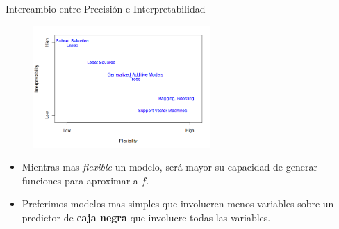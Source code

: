 \documentclass[usenames,dvipsnames]{beamer} %
\newcommand\defi[1]{\textcolor{NavyBlue}{\textit{#1}}}
\begin{document}
\begin{frame}{Intercambio entre Precisi\'on e Interpretabilidad}
\begin{figure}\label{fig:1_flexi}
	\centering
	\includegraphics[width=0.6\textwidth]{images/islr/fig_2_7.png}
\end{figure}
\begin{itemize}
	\item Mientras mas \defi{flexible} un modelo, ser\'a mayor su capacidad de generar funciones para aproximar a $f$.
	\item Preferimos modelos mas simples que involucren menos variables sobre un predictor de \textbf{caja negra} que involucre todas las variables.
\end{itemize}
\end{frame}
\end{document}
